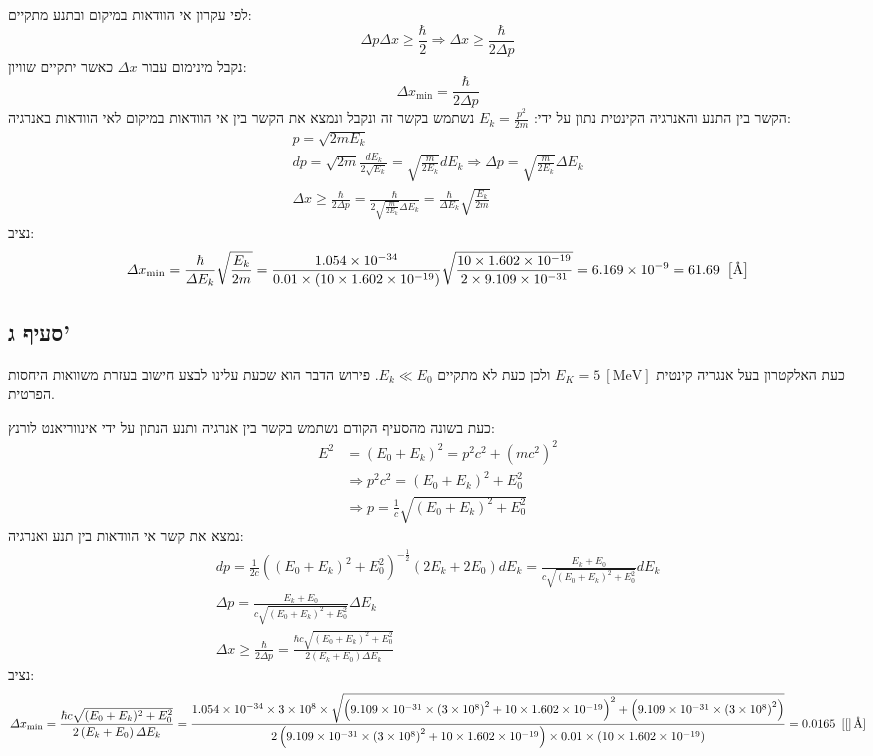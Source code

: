 \documentclass{article}
\newcommand{\rect}[1]{\left[{#1}\right]}                %
\newcommand{\p}[1]{\left({#1}\right)}                   %
\newcommand{\n}{\newline}                       %
\newcommand{\vtab}{\vspace{1em}\noindent}       %
\newcommand{\txt}[1]{\mathrm{#1}}
\newcommand{\A}{\textup{\AA}}
\newcommand{\um}[1]{~\rect{\txt{#1}}}
\newcommand{\e}[1]{\times 10^{#1}}
\newcommand{\rh}{1.054\e{-34}}      %
\newcommand{\sol}{3\e{8}}           %
\newcommand{\ec}{1.602\e{-19}}      %
\newcommand{\emass}{9.109\e{-31}}   %
\begin{document}
\vtab
לפי עקרון אי הוודאות במיקום ובתנע מתקיים: 
\[
    \Delta p\Delta x \ge \frac{\hbar}{2} \Rightarrow \Delta x \ge \frac{\hbar}{2\Delta p}
\]
נקבל מינימום עבור $\Delta x$ כאשר יתקיים שוויון:
\[
    \Delta x_{\min} = \frac{\hbar}{2\Delta p}
\]
הקשר בין התנע והאנרגיה הקינטית נתון על ידי: $E_k=\frac{p^2}{2m}$\n
נשתמש בקשר זה ונקבל ונמצא את הקשר בין אי הוודאות במיקום לאי הוודאות באנרגיה:
\begin{gather*}
    p = \sqrt{2mE_k} \\
    dp = \sqrt{2m}\frac{dE_k}{2\sqrt{E_k}} = \sqrt{\frac{m}{2E_k}}dE_k \Rightarrow \Delta p = \sqrt{\frac{m}{2E_k}}\Delta E_k
    \\
    \Delta x \ge \frac{\hbar}{2\Delta p} = \frac{\hbar}{2\sqrt{\frac{m}{2E_k}} \Delta E_k} = \frac{\hbar}{\Delta E_k}\sqrt{\frac{E_k}{2m}}
\end{gather*}
נציב:
\[
    \Delta x_{\min} = \frac{\hbar}{\Delta E_k}\sqrt{\frac{E_k}{2m}} = \frac{\rh}{0.01 \times (10 \times \ec)}\sqrt{\frac{10 \times \ec}{2\times \emass}}=6.169 \e{-9} = 61.69 \um{\A}
\]

\subsection*{סעיף ג'}
כעת האלקטרון בעל אנגריה קינטית $E_K = 5\um{MeV}$ ולכן כעת לא מתקיים $E_k \ll E_0$. פירוש הדבר הוא שכעת עלינו לבצע חישוב בעזרת משוואות היחסות הפרטית.
\n

\vtab
כעת בשונה מהסעיף הקודם נשתמש בקשר בין אנרגיה ותנע הנתון על ידי אינווריאנט לורנץ:
\begin{align*}
    E^2 &= \p{E_0 + E_k}^2 = p^2c^2 + \p{mc^2}^2 \\ 
    &\Rightarrow p^2c^2 = (E_0+E_k)^2 + E_0^2 \\
    & \Rightarrow p = \frac{1}{c}\sqrt{(E_0+E_k)^2 + E_0^2}
\end{align*}
נמצא את קשר אי הוודאות בין תנע ואנרגיה:
\begin{gather*}
    dp = \frac{1}{2c}\p{\p{E_0+E_k}^2 + E_0^2}^{-\frac{1}{2}}\p{2E_k + 2E_0}dE_k = \frac{E_k+E_0}{c\sqrt{(E_0+E_k)^2 + E_0^2}}dE_k \\
    \Delta p = \frac{E_k+E_0}{c\sqrt{(E_0+E_k)^2 + E_0^2}}\Delta E_k \\
    \Delta x \ge \frac{\hbar}{2\Delta p} = \frac{\hbar c \sqrt{(E_0+E_k)^2 + E_0^2}}{2\p{E_k+E_0}\Delta E_k}
\end{gather*}
נציב: 
\[
     \Delta x_{\min} =  \frac{\hbar c \sqrt{(E_0+E_k)^2 + E_0^2}}{2\p{E_k+E_0}\Delta E_k} = 
     \frac{\rh \times \sol \times \sqrt{\p{\emass \times \p{\sol}^2 + 10 \times \ec }^2 + \p{\emass \times \p{\sol}^2}}}{2\p{\emass \times \p{\sol}^2 + 10 \times \ec }\times 0.01 \times \p{10 \times \ec} } = 
     0.0165 \um[\A]
\]
\end{document}
